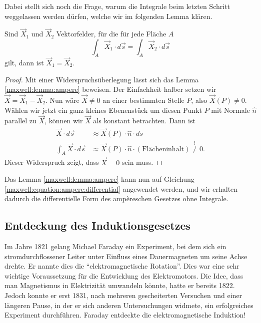 Dabei stellt sich noch die Frage, warum die Integrale beim letzten Schritt weggelassen werden dürfen, welche wir im folgenden Lemma klären.
\begin{lemma}
	\label{maxwell:lemma:ampere}
	Sind $\vec{X}_1$ und $\vec{X}_2$ Vektorfelder, für die für jede Fläche $A$
	\[
	\int_A \vec{X}_1\cdot d\vec{s}
	=
	\int_A \vec{X}_2\cdot d\vec{s}
	\]
	gilt, dann ist $\vec{X}_1=\vec{X}_2$.
\end{lemma}

\begin{proof}
	\label{maxwell:proof:ampere}
	Mit einer Widerspruchsüberlegung lässt sich das Lemma \ref{maxwell:lemma:ampere} beweisen.
	Der Einfachheit halber setzen wir $\vec{X} = \vec{X}_1-\vec{X}_2$.
	Nun wäre $\vec{X} \ne 0$ an einer bestimmten Stelle $P$, also $\vec{X}(P) \ne 0$.
	Wählen wir jetzt ein ganz kleines Ebenenstück um diesen Punkt $P$ mit Normale $\hat{n}$ parallel zu $\vec{X}$, können wir $\vec{X}$ als konstant betrachten. 
	Dann ist
	\begin{align*}
		\vec{X} \cdot d\vec{s} 
		&\approx
		\vec{X}(P) \cdot \hat{n} \cdot ds
		\\
		\int_{A} \vec{X} \cdot d\vec{s}
		&\approx
		\vec{X}(P) \cdot \hat{n} \cdot (\text{Flächeninhalt}) \overset{!}{\ne} 0.
	\end{align*}
	Dieser Widerspruch zeigt, dass $\vec{X} = 0$ sein muss.
\end{proof}
Das Lemma \ref{maxwell:lemma:ampere} kann nun auf Gleichung \eqref{maxwell:equation:ampere:differential} angewendet werden, und wir erhalten dadurch die differentielle Form des ampèreschen Gesetzes ohne Integrale.


\subsection{Entdeckung des Induktionsgesetzes}

Im Jahre 1821 gelang Michael Faraday ein Experiment, bei dem sich ein stromdurchflossener Leiter unter Einfluss eines Dauermagneten um seine Achse drehte.
%
Er nannte dies die ``elektromagnetische Rotation''.
%
Dies war eine sehr wichtige Voraussetzung für die Entwicklung des Elektromotors. 
%
Die Idee, dass man Magnetismus in Elektrizität umwandeln könnte, hatte er bereits 1822.
Jedoch konnte er erst 1831, nach mehreren gescheiterten Versuchen und einer längeren Pause, in der er sich anderen Untersuchungen widmete, ein erfolgreiches Experiment durchführen.
Faraday entdeckte die elektromagnetische Induktion!

